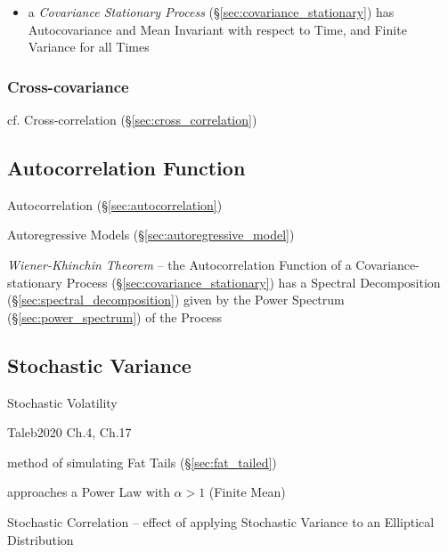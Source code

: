 \begin{itemize}
  \item a \emph{Covariance Stationary Process}
    (\S\ref{sec:covariance_stationary}) has Autocovariance and Mean
    Invariant with respect to Time, and Finite Variance for all Times
\end{itemize}



\subsubsection{Cross-covariance}\label{sec:cross_covariance}

cf. Cross-correlation (\S\ref{sec:cross_correlation})



\subsection{Autocorrelation Function}\label{sec:autocorrelation_function}

Autocorrelation (\S\ref{sec:autocorrelation})

Autoregressive Models (\S\ref{sec:autoregressive_model})

\emph{Wiener-Khinchin Theorem} -- the Autocorrelation Function of a
Covariance-stationary Process (\S\ref{sec:covariance_stationary}) has a Spectral
Decomposition (\S\ref{sec:spectral_decomposition}) given by the Power Spectrum
(\S\ref{sec:power_spectrum}) of the Process



\subsection{Stochastic Variance}\label{sec:stochastic_variance}

Stochastic Volatility

Taleb2020 Ch.4, Ch.17

method of simulating Fat Tails (\S\ref{sec:fat_tailed})

approaches a Power Law with $\alpha > 1$ (Finite Mean)

Stochastic Correlation -- effect of applying Stochastic Variance to an
Elliptical Distribution


